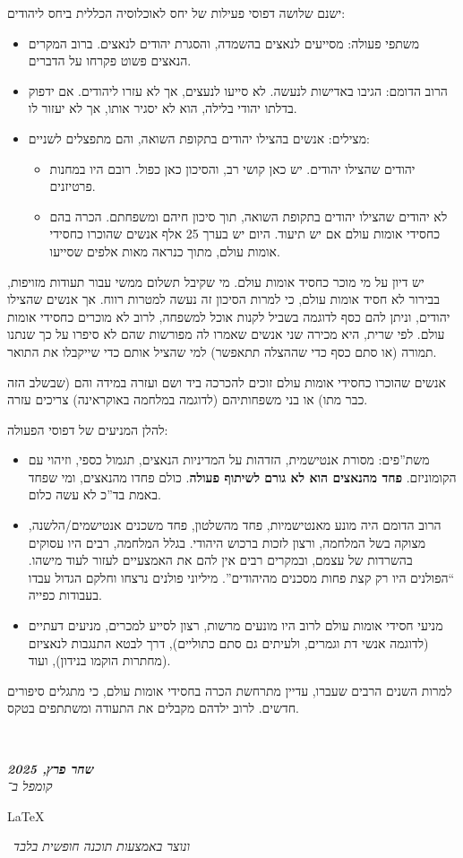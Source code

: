 \documentclass[]{article}
\newcommand\en[1] {\begin{otherlanguage}{english}#1\end{otherlanguage}}
\newcommand\ndoc  {\dotfill \\ \vfil {\begin{center}
			{\textbf{\textit{שחר פרץ, 2025}} \\
				\scriptsize \textit{קומפל ב־}\en{\LaTeX}\,\textit{ ונוצר באמצעות תוכנה חופשית בלבד}}
	\end{center}} \vfil	}
\begin{document}
	ישנם שלושה דפוסי פעילות של יחס לאוכלוסיה הכללית ביחס ליהודים: 
	\begin{itemize}
		\item משתפי פעולה: מסייעים לנאצים בהשמדה, והסגרת יהודים לנאצים. ברוב המקרים הנאצים פשוט פקרחו על הדברים. 
		\item הרוב הדומם: הגיבו באדישות לנעשה. לא סייעו לנעצים, אך לא עזרו ליהודים. אם ידפוק בדלתו יהודי בלילה, הוא לא יסגיר אותו, אך לא יעזור לו. 
		\item מצילים: אנשים בהצילו יהודים בתקופת השואה, והם מתפצלים לשניים: 
		\begin{itemize}
			\item יהודים שהצילו יהודים. יש כאן קושי רב, והסיכון כאן כפול. רובם היו במחנות פרטיזנים. 
			\item לא יהודים שהצילו יהודים בתקופת השואה, תוך סיכון חיהם ומשפחתם. הכרה בהם כחסידי אומות עולם אם יש תיעוד. היום יש בערך 25 אלף אנשים שהוכרו כחסידי אומות עולם, מתוך כנראה מאות אלפים שסייעו. 
		\end{itemize}
	\end{itemize}
	
	יש דיון על מי מוכר כחסיד אומות עולם. מי שקיבל תשלום ממשי עבור תעודות מזויפות, בבירור לא חסיד אומות עולם, כי למרות הסיכון זה נעשה למטרות רווח. אך אנשים שהצילו יהודים, וניתן להם כסף לדוגמה בשביל לקנות אוכל למשפחה, לרוב לא מוכרים כחסידי אומות עולם. לפי שרית, היא מכירה שני אנשים שאמרו לה מפורשות שהם לא סיפרו על כך שנתנו תמורה (או סתם כסף כדי שההצלה תתאפשר) למי שהציל אותם כדי שייקבלו את התואר. 
	
	אנשים שהוכרו כחסידי אומות עולם זוכים להכרכה ביד ושם ועזרה במידה והם (שבשלב הזה כבר מתו) או בני משפחותיהם (לדוגמה במלחמה באוקראינה) צריכים עזרה. 
	
	להלן המניעים של דפוסי הפעולה: 
	\begin{itemize}
		\item משת''פים: מסורת אנטישמית, הזדהות על המדיניות הנאצים, תגמול כספי, וזיהוי עם הקומוניזם. \textbf{פחד מהנאצים הוא לא גורם לשיתוף פעולה}. כולם פחדו מהנאצים, ומי שפחד באמת בד''כ לא עשה כלום. 
		\item הרוב הדומם היה מונע מאנטישמיות, פחד מהשלטון, פחד משכנים אנטישמים/הלשנה, מצוקה בשל המלחמה, ורצון לזכות ברכוש היהודי. בגלל המלחמה, רבים היו עסוקים בהשרדות של עצמם, ובמקרים רבים אין להם את האמצעיים לעזור לעוד מישהו. ``הפולנים היו רק קצת פחות מסכנים מהיהודים''. מיליוני פולנים נרצחו וחלקם הגדול עבדו בעבודות כפייה. 
		\item מניעי חסידי אומות עולם לרוב היו מונעים מרשות, רצון לסייע למכרים, מניעים דעתיים (לדוגמה אנשי דת וגמרים, ולעיתים גם סתם כתוליים), דרך לבטא התנגבות לנאציזם (מחתרות הוקמו בנידון), ועוד. 
	\end{itemize}
	
	למרות השנים הרבים שעברו, עדיין מתרחשת הכרה בחסידי אומות עולם, כי מתגלים סיפורים חדשים. לרוב ילדהם מקבלים את התעודה ומשתתפים בטקס. 
	
	
	
	
	
	
	
	
	
	
	\ndoc
\end{document}
